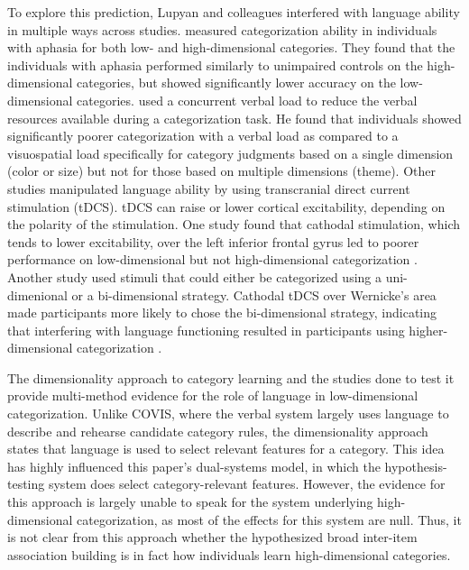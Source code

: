 \documentclass[../dissertation.tex]{subfiles}
\begin{document}
	To explore this prediction, Lupyan and colleagues interfered with language ability in multiple ways across studies. \citet{Lupyan2013} measured categorization ability in individuals with aphasia for both low- and high-dimensional categories. They found that the individuals with aphasia performed similarly to unimpaired controls on the high-dimensional categories, but showed significantly lower accuracy on the low-dimensional categories. \citet{Lupyan2009} used a concurrent verbal load to reduce the verbal resources available during a categorization task. He found that individuals showed significantly poorer categorization with a verbal load as compared to a visuospatial load specifically for category judgments based on a single dimension (color or size) but not for those based on multiple dimensions (theme). Other studies manipulated language ability by using transcranial direct current stimulation (tDCS). tDCS can raise or lower cortical excitability, depending on the polarity of the stimulation. One study found that cathodal stimulation, which tends to lower excitability, over the left inferior frontal gyrus led to poorer performance on low-dimensional but not high-dimensional categorization \citep{Lupyan2012b}. Another study used stimuli that could either be categorized using a uni-dimenional or a bi-dimensional strategy. Cathodal tDCS over Wernicke's area made participants more likely to chose the bi-dimensional strategy, indicating that interfering with language functioning resulted in participants using higher-dimensional categorization \citep{Perry2014}. \par 
	The dimensionality approach to category learning and the studies done to test it provide multi-method evidence for the role of language in low-dimensional categorization. Unlike COVIS, where the verbal system largely uses language to describe and rehearse candidate category rules, the dimensionality approach states that language is used to select relevant features for a category. This idea has highly influenced this paper's dual-systems model, in which the hypothesis-testing system does select category-relevant features. However, the evidence for this approach is largely unable to speak for the system underlying high-dimensional categorization, as most of the effects for this system are null. Thus, it is not clear from this approach whether the hypothesized broad inter-item association building is in fact how individuals learn high-dimensional categories.
\end{document}
